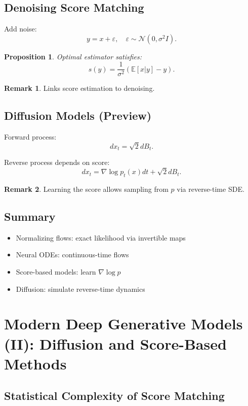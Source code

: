\documentclass[12pt,oneside]{book}
\numberwithin{equation}{section}
\theoremstyle{definition}
\newtheorem{remark}{Remark}[section]
\theoremstyle{plain}
\newtheorem{proposition}{Proposition}[section]
\theoremstyle{remark}
\newcommand{\E}{\mathbb{E}}
\newcommand{\Normal}{\mathcal{N}}
\begin{document}
\section{Denoising Score Matching}

Add noise:
\[
y = x + \varepsilon, \quad \varepsilon \sim \Normal(0, \sigma^2 I).
\]

\begin{proposition}
Optimal estimator satisfies:
\[
s(y) = \frac{1}{\sigma^2} (\E[x|y] - y).
\]
\end{proposition}

\begin{remark}
Links score estimation to denoising.
\end{remark}

\section{Diffusion Models (Preview)}

Forward process:
\[
dx_t = \sqrt{2} dB_t.
\]

Reverse process depends on score:
\[
dx_t = \nabla \log p_t(x) dt + \sqrt{2} dB_t.
\]

\begin{remark}
Learning the score allows sampling from $p$ via reverse-time SDE.
\end{remark}

\section{Summary}

\begin{itemize}
    \item Normalizing flows: exact likelihood via invertible maps
    \item Neural ODEs: continuous-time flows
    \item Score-based models: learn $\nabla \log p$
    \item Diffusion: simulate reverse-time dynamics
\end{itemize}

\chapter{Modern Deep Generative Models (II): Diffusion and Score-Based Methods}

\section{Statistical Complexity of Score Matching}
\end{document}
